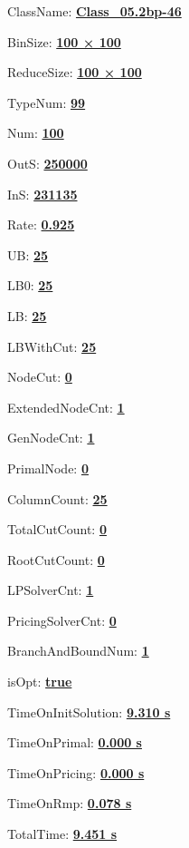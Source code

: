 \documentclass[11pt]{article}
\begin{document}
\pagestyle{empty}


ClassName: \underline{\textbf{Class_05.2bp-46}}
\par
BinSize: \underline{\textbf{100 × 100}}
\par
ReduceSize: \underline{\textbf{100 × 100}}
\par
TypeNum: \underline{\textbf{99}}
\par
Num: \underline{\textbf{100}}
\par
OutS: \underline{\textbf{250000}}
\par
InS: \underline{\textbf{231135}}
\par
Rate: \underline{\textbf{0.925}}
\par
UB: \underline{\textbf{25}}
\par
LB0: \underline{\textbf{25}}
\par
LB: \underline{\textbf{25}}
\par
LBWithCut: \underline{\textbf{25}}
\par
NodeCut: \underline{\textbf{0}}
\par
ExtendedNodeCnt: \underline{\textbf{1}}
\par
GenNodeCnt: \underline{\textbf{1}}
\par
PrimalNode: \underline{\textbf{0}}
\par
ColumnCount: \underline{\textbf{25}}
\par
TotalCutCount: \underline{\textbf{0}}
\par
RootCutCount: \underline{\textbf{0}}
\par
LPSolverCnt: \underline{\textbf{1}}
\par
PricingSolverCnt: \underline{\textbf{0}}
\par
BranchAndBoundNum: \underline{\textbf{1}}
\par
isOpt: \underline{\textbf{true}}
\par
TimeOnInitSolution: \underline{\textbf{9.310 s}}
\par
TimeOnPrimal: \underline{\textbf{0.000 s}}
\par
TimeOnPricing: \underline{\textbf{0.000 s}}
\par
TimeOnRmp: \underline{\textbf{0.078 s}}
\par
TotalTime: \underline{\textbf{9.451 s}}
\par
\newpage


\end{document}
